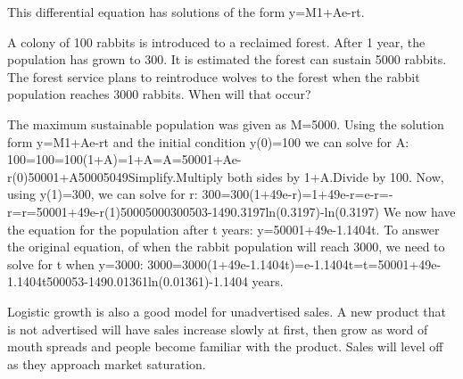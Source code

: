 This differential equation has solutions of the form
y=M1+Ae-rt.
\begin{example}
A colony of 100 rabbits is introduced to a reclaimed forest. After 1 year, the population has grown to 300. It is estimated the forest can sustain 5000 rabbits. The forest service plans to reintroduce wolves to the forest when the rabbit population reaches 3000 rabbits. When will that occur?

\begin{solution} 
The maximum sustainable population was given as M=5000. Using the solution form
y=M1+Ae-rt
and the initial condition y(0)=100 we can solve for A:
100=100=100(1+A)=1+A=A=50001+Ae-r(0)50001+A50005049Simplify.Multiply both sides by 1+A.Divide by 100.
Now, using y(1)=300, we can solve for r:
300=300(1+49e-r)=1+49e-r=e-r=-r=r=50001+49e-r(1)50005000300503-149\approx   0.3197ln(0.3197)-ln(0.3197)
We now have the equation for the population after t years:
y=50001+49e-1.1404t.
To answer the original equation, of when the rabbit population will reach 3000, we need to solve for t when y=3000:
3000=3000(1+49e-1.1404t)=e-1.1404t=t=50001+49e-1.1404t500053-149\approx   0.01361ln(0.01361)-1.1404 years.
\end{solution}\end{example}

Logistic growth is also a good model for unadvertised sales. A new product that is not advertised will have sales increase slowly at first, then grow as word of mouth spreads and people become familiar with the product. Sales will level off as they approach market saturation.
